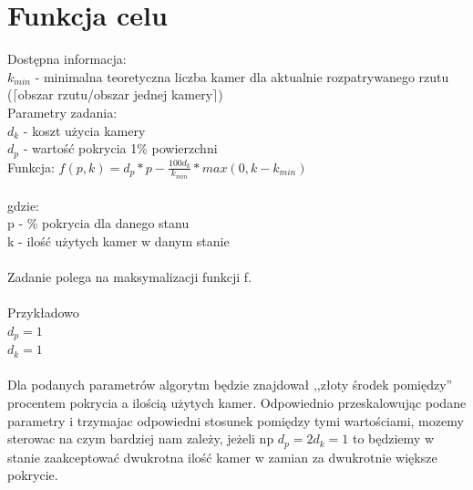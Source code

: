 \documentclass[12pt,a4paper]{article}
\begin{document}
\section{Funkcja celu}
Dostępna informacja: \\
\footnotesize
$k_{min}$ - minimalna teoretyczna liczba kamer dla aktualnie rozpatrywanego rzutu \\ \indent ($\lceil$obszar rzutu/obszar jednej kamery$\rceil$) \\
\normalsize
%
\newline
Parametry zadania: \\
$d_k$ - koszt użycia kamery \\
$d_p$ - wartość pokrycia 1\% powierzchni\\
\newline
Funkcja:
$f(p, k) = d_p*p - \frac{100d_k}{k_{min}}*max(0,k - k_{min}) $ \\ \\
gdzie: \\
p - \% pokrycia dla danego stanu \\
k - ilość użytych kamer w danym stanie \\ \\
Zadanie polega na maksymalizacji funkcji f. \\ \\ 
Przykładowo \\
$ d_p = 1$ \\
$ d_k = 1$ \\ \\ 
Dla podanych parametrów algorytm będzie znajdował ,,złoty środek pomiędzy'' 
procentem pokrycia a ilością użytych kamer.
Odpowiednio przeskalowując podane parametry i trzymajac odpowiedni 
stosunek pomiędzy tymi wartościami,
mozemy sterowac na czym bardziej nam zależy, jeżeli np 
$d_p = 2d_k = 1 $ to będziemy w stanie zaakceptować dwukrotna 
ilość kamer w zamian za dwukrotnie większe pokrycie.
%
\end{document}
